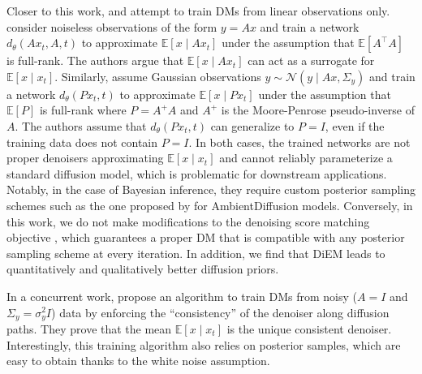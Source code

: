 Closer to this work, \textcite{daras2023ambient} and \textcite{kawar2024gsurebased} attempt to train DMs from linear observations only. \textcite{daras2023ambient} consider noiseless observations of the form $y = Ax$ and train a network $d_\theta(A x_t, A, t)$ to approximate $\mathbb{E}[x \mid A x_t]$ under the assumption that $\mathbb{E}[A^\top \! A]$ is full-rank. The authors argue that $\mathbb{E}[x \mid A x_t]$ can act as a surrogate for $\mathbb{E}[x \mid x_t]$. Similarly, \textcite{kawar2024gsurebased} assume Gaussian observations $y \sim \mathcal{N}(y \mid Ax, \Sigma_y)$ and train a network $d_\theta(P x_t, t)$ to approximate $\mathbb{E}[x \mid P x_t]$ under the assumption that $\mathbb{E}[P]$ is full-rank where $P = A^+ \! A$ and $A^+$ is the Moore-Penrose pseudo-inverse of $A$. The authors assume that $d_\theta(P x_t, t)$ can generalize to $P = I$, even if the training data does not contain $P = I$.  In both cases, the trained networks are not proper denoisers approximating $\mathbb{E}[x \mid x_t]$ and cannot reliably parameterize a standard diffusion model, which is problematic for downstream applications. Notably, in the case of Bayesian inference, they require custom posterior sampling schemes such as the one proposed by \textcite{aali2025ambient} for AmbientDiffusion \cite{daras2023ambient} models. Conversely, in this work, we do not make modifications to the denoising score matching objective \cite{hyvarinen2005estimation, vincent2011connection}, which guarantees a proper DM that is compatible with any posterior sampling scheme at every iteration. In addition, we find that DiEM leads to quantitatively and qualitatively better diffusion priors.

In a concurrent work, \textcite{daras2024consistent} propose an algorithm to train DMs from noisy ($A = I$ and $\Sigma_y = \sigma_y^2 I$) data by enforcing the \enquote{consistency} of the denoiser along diffusion paths. They prove that the mean $\mathbb{E}[x \mid x_t]$ is the unique consistent denoiser. Interestingly, this training algorithm also relies on posterior samples, which are easy to obtain thanks to the white noise assumption.

